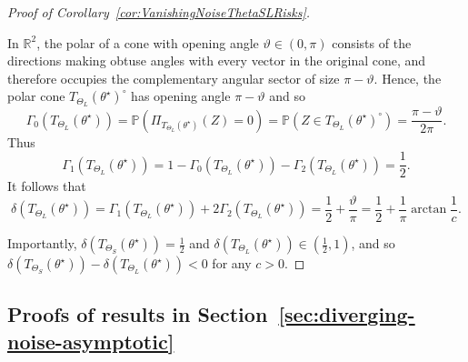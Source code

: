 \documentclass[11pt]{article}
\theoremstyle{plain}
\theoremstyle{definition}
\providecommand{\mathbbm}{\mathbb} %
\newcommand{\R}{\mathbbm{R}}
\begin{document}
\begin{proof}[Proof of Corollary~\ref{cor:VanishingNoiseThetaSLRisks}]
\begin{itemize}
In $\R^2$, the polar of a cone with opening angle $\vartheta\in(0,\pi)$ consists of the directions making
obtuse angles with every vector in the original cone, and therefore occupies
the complementary angular sector of size $\pi-\vartheta$. Hence, the polar cone $T_{\Theta_L}(\theta^\star)^\circ$ has opening angle
$\pi-\vartheta$ and so
\[
\Gamma_0(T_{\Theta_L}(\theta^\star))
=
\mathbb{P}(\Pi_{T_{\Theta_L}(\theta^\star)}(Z)=0)
=
\mathbb{P}(Z\in T_{\Theta_L}(\theta^\star)^\circ)
=
\frac{\pi-\vartheta}{2\pi}.
\]
Thus
\[
\Gamma_1(T_{\Theta_L}(\theta^\star))
=
1-\Gamma_0(T_{\Theta_L}(\theta^\star))
-\Gamma_2 (T_{\Theta_L}(\theta^\star))
=
\frac12.
\]
It follows that 
\[
\delta(T_{\Theta_L}(\theta^\star))
=
\Gamma_1(T_{\Theta_L}(\theta^\star))
+
2  \Gamma_2 (T_{\Theta_L}(\theta^\star))
=
\frac12+\frac{\vartheta}{\pi}
=
\frac12+\frac1\pi \arctan \frac1c .
\]
\end{itemize}
Importantly, $\delta(T_{\Theta_S}(\theta^\star))=\frac12$ and $\delta(T_{\Theta_L}(\theta^\star))\in(\frac12,1)$, and so $\delta(T_{\Theta_S}(\theta^\star)) - \delta(T_{\Theta_L}(\theta^\star)) <0$ for any $c > 0$.
\end{proof}




\subsection{Proofs of results in Section~\ref{sec:diverging-noise-asymptotic}}
\end{document}
